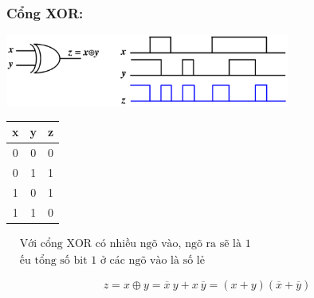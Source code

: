 \subsubsection{Cổng XOR:}
\begin{center}
    \includegraphics[width = 0.7\textwidth]{./local/image/25.png}
\end{center}
\begin{table}[h!]
    \centering
    \begin{tabular}{|cc|c|}
    \hline
    \textbf{x} & \textbf{y} & \textbf{z} \\ \hline
    0          & 0          & 0                      \\
    0          & 1          & 1                      \\
    1          & 0          & 1                      \\
    1          & 1          & 0                      \\ \hline
    \end{tabular} \qquad
    $\begin{aligned}
        &\text{Với cổng XOR có nhiều ngõ vào, ngõ ra sẽ là 1}\\
        &\text{ếu tổng số bit 1 ở các ngõ vào là số lẻ}
    \end{aligned}$
\end{table}
\[
    z = x \oplus y = \overline{x}\ y + x\ \overline{y} = (x+y)(\overline{x} + \overline{y})
\]
